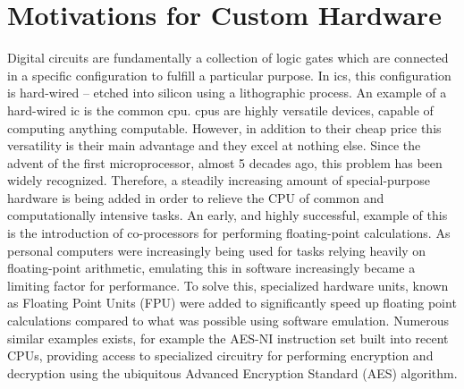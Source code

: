 \section{Motivations for Custom Hardware}






Digital circuits are fundamentally a collection of logic gates which are
connected in a specific configuration to fulfill a particular purpose. In
\glspl{ic}, this configuration is hard-wired -- etched into
silicon using a lithographic process. An example of a hard-wired \gls{ic} is the
common \gls{cpu}. \glspl{cpu} are highly versatile devices, capable
of computing anything computable. However, in addition to their cheap price this
versatility is their main advantage and they excel at nothing else.
Since the advent of the first microprocessor, almost 5 decades ago, this problem
has been widely recognized. Therefore, a steadily increasing amount of
special-purpose hardware is being added in order to relieve the CPU of common
and computationally intensive tasks. An early, and highly successful, example of
this is the introduction of co-processors for performing floating-point
calculations. As personal computers were increasingly being used for tasks
relying heavily on floating-point arithmetic, emulating this in software
increasingly became a limiting factor for performance. To solve this,
specialized hardware units, known as Floating Point Units (FPU) were added to
significantly speed up floating point calculations compared to what was possible
using software emulation. Numerous similar examples exists, for example the
AES-NI instruction set built into recent CPUs, providing access to specialized
circuitry for performing encryption and decryption using the ubiquitous Advanced
Encryption Standard (AES) algorithm.

